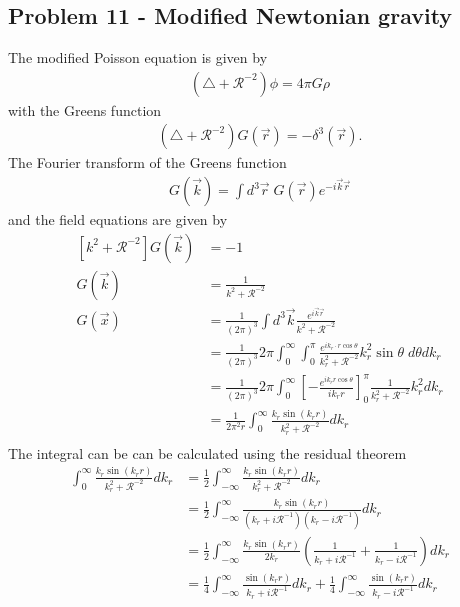 \documentclass[10pt,a4paper]{book}
\theoremstyle{definition}
\begin{document}
\subsection{Problem 11 - Modified Newtonian gravity}
The modified Poisson equation is given by
\begin{align}
    \left(\triangle+\mathcal{R}^{-2}\right)\phi=4\pi G\rho
\end{align}
with the Greens function
\begin{align}
    \left(\triangle+\mathcal{R}^{-2}\right)G(\vec{r})=-\delta^3(\vec{r}).
\end{align}
The Fourier transform of the Greens function
\begin{align}
    G(\vec{k}) = \int d^3\vec{r}\;G(\vec{r})e^{-i\vec{k}\vec{r}}
\end{align}
and the field equations are given by
\begin{align}
    \left[k^2+\mathcal{R}^{-2}\right]G(\vec{k})&=-1\\
    G(\vec{k})&=\frac{1}{k^2+\mathcal{R}^{-2}}\\
    G(\vec{x})&=\frac{1}{(2\pi)^3}\int d^3\vec{k} \frac{e^{i\vec{k}\vec{r}}}{k^2+\mathcal{R}^{-2}}\\
    &=\frac{1}{(2\pi)^3}2\pi\int_0^\infty \int_{0}^{\pi} \frac{e^{ik_r\cdot r\cos\theta}}{k_r^2+\mathcal{R}^{-2}}k_r^2\sin\theta\;d\theta dk_r\\
    &=\frac{1}{(2\pi)^3}2\pi\int_0^\infty \left[-\frac{e^{ik_r r \cos\theta}}{ik_r r}\right]_0^\pi \frac{1}{k_r^2+\mathcal{R}^{-2}}k_r^2 dk_r\\
    &=\frac{1}{2\pi^2r}\int_0^\infty  \frac{k_r \sin(k_r r)}{k_r^2+\mathcal{R}^{-2}} dk_r\\
\end{align}
The integral can be can be calculated using the residual theorem
\begin{align}
        \int_0^\infty \frac{k_r \sin(k_r r)}{k_r^2+\mathcal{R}^{-2}} dk_r&=\frac{1}{2}\int_{-\infty}^\infty \frac{k_r \sin(k_r r)}{k_r^2+\mathcal{R}^{-2}} dk_r\\
        &=\frac{1}{2}\int_{-\infty}^\infty \frac{k_r \sin(k_r r)}{(k_r+i\mathcal{R}^{-1})(k_r-i\mathcal{R}^{-1})} dk_r\\
        &=\frac{1}{2}\int_{-\infty}^\infty \frac{k_r \sin(k_r r)}{2k_r}\left(\frac{1}{k_r+i\mathcal{R}^{-1}}+\frac{1}{k_r-i\mathcal{R}^{-1}}\right) dk_r\\
        &=\frac{1}{4}\int_{-\infty}^\infty \frac{\sin(k_r r)}{k_r+i\mathcal{R}^{-1}}dk_r + \frac{1}{4}\int_{-\infty}^\infty \frac{\sin(k_r r)}{k_r-i\mathcal{R}^{-1}}dk_r
\end{align}
\end{document}
